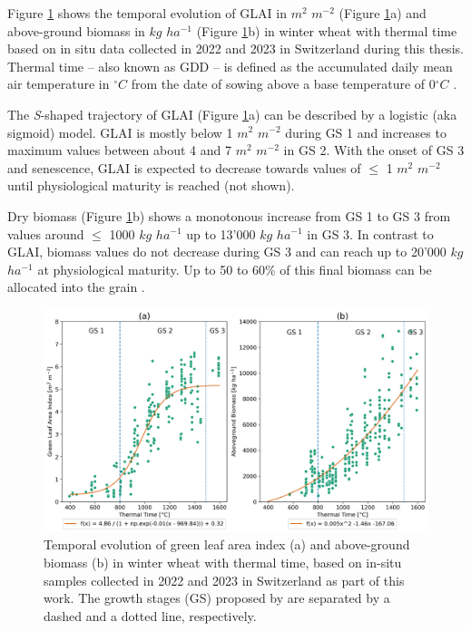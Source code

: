 Figure \ref{fig:ww-growth-development} shows the temporal evolution of \gls{GLAI} in $m^2$ $m^{-2}$ (Figure \ref{fig:ww-growth-development}a) and above-ground biomass in $kg$ $ha^{-1}$ (Figure \ref{fig:ww-growth-development}b) in winter wheat with thermal time based on in situ data collected in 2022 and 2023 in Switzerland during this thesis. Thermal time -- also known as \gls{GDD} -- is defined as the accumulated daily mean air temperature in $^{\circ} C$ from the date of sowing above a base temperature of 0$^{\circ} C$ \citep{mcmaster_growing_1997}.

The \textsl{S}-shaped trajectory of \gls{GLAI} (Figure \ref{fig:ww-growth-development}a) can be described by a logistic (aka sigmoid) model. \gls{GLAI} is mostly below 1 $m^2$ $m^{-2}$ during \gls{GS} 1 and increases to maximum values between about 4 and 7 $m^2$ $m^{-2}$ in \gls{GS} 2. With the onset of \gls{GS} 3 and senescence, \gls{GLAI} is expected to decrease towards values of $\le$ 1 $m^2$ $m^{-2}$ until physiological maturity is reached (not shown).

Dry biomass (Figure \ref{fig:ww-growth-development}b) shows a monotonous increase from \gls{GS} 1 to \gls{GS} 3 from values around $\le$ 1000 $kg$ $ha^{-1}$ up to 13'000 $kg$ $ha^{-1}$ in \gls{GS} 3. In contrast to \gls{GLAI}, biomass values do not decrease during \gls{GS} 3 and can reach up to 20'000 $kg$ $ha^{-1}$ at physiological maturity. Up to 50 to 60\% of this final biomass can be allocated into the grain \citep{long_meeting_2015}.

\begin{figure}[H]
    \centering
    \includegraphics[width=\textwidth]{01-Introduction/img/glai_and_biomass_growth-stages.png}
    \caption{Temporal evolution of green leaf area index (a) and above-ground biomass (b) in winter wheat with thermal time, based on in-situ samples collected in 2022 and 2023 in Switzerland as part of this work. The growth stages (GS) proposed by \cite{kirby_analysis_1988} are separated by a dashed and a dotted line, respectively.}
    \label{fig:ww-growth-development}
\end{figure}


